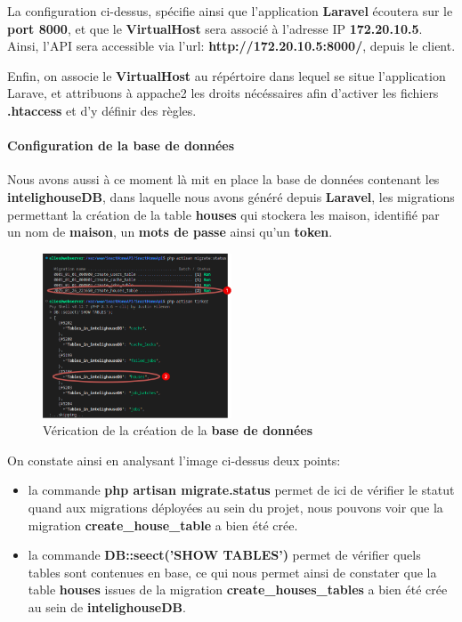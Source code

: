 \documentclass[10pt, a4paper]{report}
\begin{document}
	La configuration ci-dessus, spécifie ainsi que l'application \textbf{Laravel} écoutera sur le \textbf{port 8000}, et que le \textbf{VirtualHost} sera associé à l'adresse IP \textbf{172.20.10.5}. Ainsi, l'API sera accessible via l'url: \textbf{http://172.20.10.5:8000/}, depuis le client.
	
	Enfin, on associe le \textbf{VirtualHost} au répértoire dans lequel se situe l'application Larave, et attribuons à appache2 les droits nécéssaires afin d'activer les fichiers \textbf{.htaccess} et d'y définir des règles.
	
	\paragraph{Configuration de la base de données}
	Nous avons aussi à ce moment là mit en place la base de données contenant les \textbf{intelighouseDB}, dans laquelle nous avons généré depuis \textbf{Laravel}, les migrations permettant la création de la table \textbf{houses} qui stockera les maison, identifié par un nom de \textbf{maison}, un \textbf{mots de passe} ainsi qu'un \textbf{token}.
	
	\begin{figure}[h!]
		\centering
		\includegraphics[width=0.5\textwidth]{ressources/img/preuves/preuveMigration}
		\caption{Vérication de la création de la \textbf{base de données}}
		\label{fig:preuveBDD}
	\end{figure}
	\newpage
	On constate ainsi en analysant l'image ci-dessus deux points:
	\begin{itemize}
		\item la commande \textbf{php artisan migrate.status} permet de ici de vérifier le statut quand aux migrations déployées au sein du projet, nous pouvons voir que la migration \textbf{create\_house\_table} a bien été crée. 
		\item la commande \textbf{DB::seect('SHOW TABLES')} permet de vérifier quels tables sont contenues en base, ce qui nous permet ainsi de constater que la table \textbf{houses} issues de la migration \textbf{create\_houses\_tables} a bien été crée au sein de \textbf{intelighouseDB}.
	\end{itemize}
	
\end{document}
